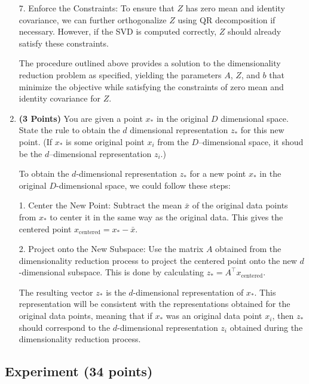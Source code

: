 \documentclass[a4paper]{article}
\theoremstyle{definition}
\newenvironment{soln}{
    \leavevmode\color{blue}\ignorespaces
}{}
\begin{document}
\begin{enumerate}
\begin{soln}
7. Enforce the Constraints: To ensure that \( Z \) has zero mean and identity covariance, we can further orthogonalize \( Z \) using QR decomposition if necessary. However, if the SVD is computed correctly, \( Z \) should already satisfy these constraints.
    
The procedure outlined above provides a solution to the dimensionality reduction problem as specified, yielding the parameters \( A \), \( Z \), and \( b \) that minimize the objective while satisfying the constraints of zero mean and identity covariance for \( Z \).
\end{soln}

\item \textbf{(3 Points)}
You are given a point $x_*$ in the original $D$ dimensional space.
State the rule to obtain the $d$ dimensional
representation $z_*$ for this new point.
(If $x_*$ is some original point $x_i$ from the $D$--dimensional space, it shoud be the
$d$--dimensional representation $z_i$.)

\begin{soln}
To obtain the \( d \)-dimensional representation \( z_* \) for a new point \( x_* \) in the original \( D \)-dimensional space, we could follow these steps:

1. Center the New Point: Subtract the mean \( \bar{x} \) of the original data points from \( x_* \) to center it in the same way as the original data. This gives the centered point \( x_{\text{centered}} = x_* - \bar{x} \).
    
2. Project onto the New Subspace: Use the matrix \( A \) obtained from the dimensionality reduction process to project the centered point onto the new \( d \)-dimensional subspace. This is done by calculating \( z_* = A^\top x_{\text{centered}} \).
    
The resulting vector \( z_* \) is the \( d \)-dimensional representation of \( x_* \). This representation will be consistent with the representations obtained for the original data points, meaning that if \( x_* \) was an original data point \( x_i \), then \( z_* \) should correspond to the \( d \)-dimensional representation \( z_i \) obtained during the dimensionality reduction process.
\end{soln}

\end{enumerate}


\subsection{Experiment (34 points)}
\end{document}
